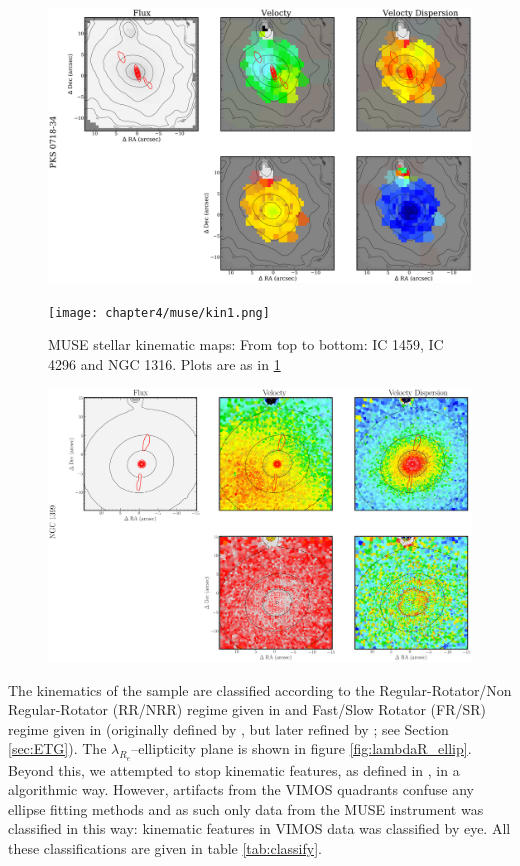 		\begin{figure}
			\centering
			\includegraphics[height=0.31\textheight]{chapter4/vimos/kin4.png}
		\end{figure}


		\begin{figure}
			\centering
			\texttt{[image: chapter4/muse/kin1.png]}
			\caption[MUSE stellar kinematic maps]{MUSE stellar kinematic maps: From top to bottom: IC 1459, IC 4296 and NGC 1316. Plots are as in \ref{fig:MUSE_stellar}}
			\label{fig:MUSE_stellar}
		\end{figure}
		\begin{figure}
			\centering
			\includegraphics[height=0.31\textheight]{chapter4/muse/kin2.png}
		\end{figure}

		
		The kinematics of the sample are classified according to the Regular-Rotator/Non Regular-Rotator (RR/NRR) regime given in \citet{Krajnovic2011} and Fast/Slow Rotator (FR/SR) regime given in \citet{Cappellari2016} (originally defined by \citealt{Emsellem2011}, but later refined by \citealt{Cappellari2016}; see Section \ref{sec:ETG}). The $\lambda_{R_e}$--ellipticity plane is shown in figure \ref{fig:lambdaR_ellip}. Beyond this, we attempted to stop kinematic features, as defined in \citet{Krajnovic2011}, in a algorithmic way. However, artifacts from the VIMOS quadrants confuse any ellipse fitting methods and as such only data from the MUSE instrument was classified in this way: kinematic features in VIMOS data was classified by eye. All these classifications are given in table \ref{tab:classify}. 


